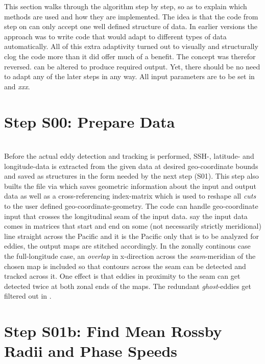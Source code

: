 This section walks through the algorithm step by step, so as to explain
which
methods are used and how they are implemented.
The idea is that the code from step  on can only accept one well
defined structure of data. In earlier versions the approach was to write code
that would adapt to different types of data automatically. All of this extra
adaptivity turned out to visually and structurally clog the code more than it
did offer much of a benefit. The concept was therefor reversed. can be altered to produce required output. Yet, there
should be no need to adapt any of the later steps in any way.
All input parameters are to be set in  and \textit{xxx}.

\section{Step S00: Prepare Data}
	\\
Before the actual eddy detection and tracking is performed,  SSH-, latitude- and longitude-data is extracted from the given data at desired geo-coordinate bounds and saved as structures in the form needed by the next step (S01). This step also builts the file  via  which saves geometric information about the input and output data as well as a cross-referencing index-matrix which is used to reshape all \textit{cuts} to the user defined geo-coordinate-geometry. The code can handle geo-coordinate input that crosses the longitudinal seam of
the input data. \Eg say the input data comes in matrices that start and end on
some (not necessarily strictly meridional) line straight across the Pacific and
it is the Pacific only that is to be analyzed for eddies, the output maps are
stitched accordingly. In the zonally continous case \ie the full-longitude case, an \textit{overlap} in x-direction across the \textit{seam}-meridian of the chosen map is included so that contours across the seam can be detected and tracked across it. One effect is that eddies in proximity to the seam can get detected twice at both zonal ends of the maps. The redundant \textit{ghost}-eddies get filtered out in .
\section{Step S01b: Find Mean Rossby Radii and Phase Speeds}
\\


